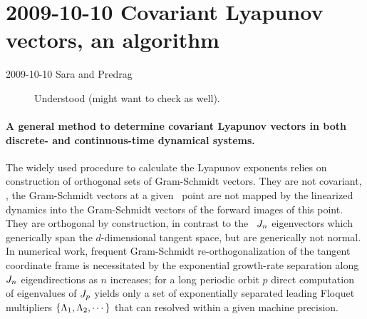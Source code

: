 \section{2009-10-10  Covariant Lyapunov vectors, an algorithm}

\begin{description}
\item[2009-10-10 Sara and Predrag] Understood
 (might want to
check  as well).
\end{description}

\paragraph{
A general method to
determine covariant Lyapunov vectors in both discrete- and
continuous-time dynamical systems.
            }

The widely used procedure to calculate the Lyapunov
exponents relies on construction of orthogonal
sets of Gram-Schmidt vectors. They  are not covariant,
\ie, the Gram-Schmidt vectors at a given \statesp\ point are not mapped by the
linearized dynamics into the Gram-Schmidt vectors of the forward images of
this point. They are orthogonal by construction, in contrast
to the \jacobianM\ $J_n$ eigenvectors \jEigvec[i] which
generically span the $d$-dimensional tangent space, but are
generically not normal. In numerical work, frequent
Gram-Schmidt re-orthogonalization of the tangent coordinate
frame is necessitated by the exponential growth-rate
separation along $J_n$ eigendirections as $n$ increases;
for a long periodic orbit $p$ direct computation of
eigenvalues of $J_p$ yields only a set of exponentially
separated leading Floquet multipliers
$\{\Lambda_1,\Lambda_2,\cdots\}$ that can resolved within a
given machine precision.

